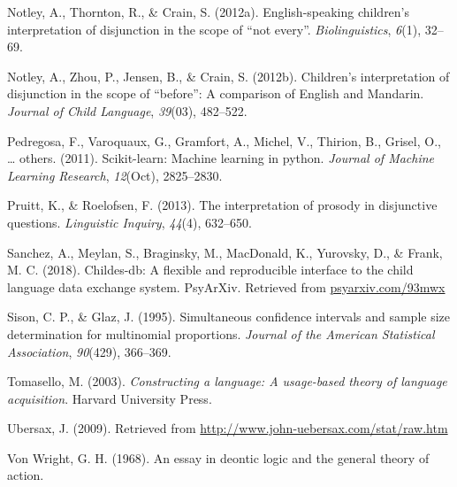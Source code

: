\documentclass[,man,floatsintext]{apa6}
\begin{document}
\leavevmode\hypertarget{ref-notley2012notevery}{}%
Notley, A., Thornton, R., \& Crain, S. (2012a). English-speaking children's interpretation of disjunction in the scope of ``not every''. \emph{Biolinguistics}, \emph{6}(1), 32--69.

\leavevmode\hypertarget{ref-notley2012children}{}%
Notley, A., Zhou, P., Jensen, B., \& Crain, S. (2012b). Children's interpretation of disjunction in the scope of ``before'': A comparison of English and Mandarin. \emph{Journal of Child Language}, \emph{39}(03), 482--522.

\leavevmode\hypertarget{ref-pedregosa2011scikit}{}%
Pedregosa, F., Varoquaux, G., Gramfort, A., Michel, V., Thirion, B., Grisel, O., \ldots{} others. (2011). Scikit-learn: Machine learning in python. \emph{Journal of Machine Learning Research}, \emph{12}(Oct), 2825--2830.

\leavevmode\hypertarget{ref-pruitt2013interpretation}{}%
Pruitt, K., \& Roelofsen, F. (2013). The interpretation of prosody in disjunctive questions. \emph{Linguistic Inquiry}, \emph{44}(4), 632--650.

\leavevmode\hypertarget{ref-sanchez2018childes}{}%
Sanchez, A., Meylan, S., Braginsky, M., MacDonald, K., Yurovsky, D., \& Frank, M. C. (2018). Childes-db: A flexible and reproducible interface to the child language data exchange system. PsyArXiv. Retrieved from \url{psyarxiv.com/93mwx}

\leavevmode\hypertarget{ref-sison1995simultaneous}{}%
Sison, C. P., \& Glaz, J. (1995). Simultaneous confidence intervals and sample size determination for multinomial proportions. \emph{Journal of the American Statistical Association}, \emph{90}(429), 366--369.

\leavevmode\hypertarget{ref-tomasello2003constructing}{}%
Tomasello, M. (2003). \emph{Constructing a language: A usage-based theory of language acquisition}. Harvard University Press.

\leavevmode\hypertarget{ref-ubersax2009}{}%
Ubersax, J. (2009). Retrieved from \url{http://www.john-uebersax.com/stat/raw.htm}

\leavevmode\hypertarget{ref-von1968essay}{}%
Von Wright, G. H. (1968). An essay in deontic logic and the general theory of action.
\end{document}
